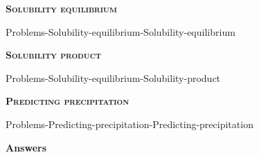 \documentclass[main.tex]{subfiles}
\begin{document}
\newpage
 
\fancyhfoffset[E,O]{0pt}
\setlength{\columnsep}{30pt}
\begin{conclusion}
\end{conclusion}
\begin{multicols*}{2}\setcounter{numA}{1}

{\raggedright\textsc{\textbf{Solubility equilibrium}}\par}
 {Problems-Solubility-equilibrium-Solubility-equilibrium}

{\raggedright\textsc{\textbf{Solubility product}}\par}
 {Problems-Solubility-equilibrium-Solubility-product}



{\raggedright\textsc{\textbf{Predicting precipitation}}\par}
 {Problems-Predicting-precipitation-Predicting-precipitation}
 
 

\end{multicols*}

\newpage
\begin{answersenvironment}
\begin{minipage}[c]{1\textwidth}
\begin{localsize}{10}
{\Large \bf Answers}
\end{localsize}
\end{minipage}\end{answersenvironment}
\end{document}

